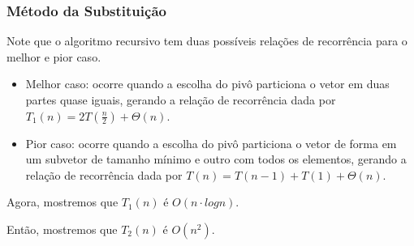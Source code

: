 \subsubsection{Método da Substituição}
Note que o algoritmo recursivo tem duas possíveis relações de recorrência para o melhor e pior caso. \\
\begin{itemize}
  \item Melhor caso: ocorre quando a escolha do pivô particiona o vetor em duas partes quase iguais, gerando a relação de recorrência dada por $T_1(n) = 2T(\frac{n}{2}) + \Theta(n)$.
  \item Pior caso: ocorre quando a escolha do pivô particiona o vetor de forma em um subvetor de tamanho mínimo e outro com todos os elementos, gerando a relação de recorrência dada por $T(n) = T(n - 1) + T(1) + \Theta(n)$.
\end{itemize}

Agora, mostremos que $T_1(n)$ é $O(n \cdot log n)$.

Então, mostremos que $T_2(n)$ é $O(n^2)$.
